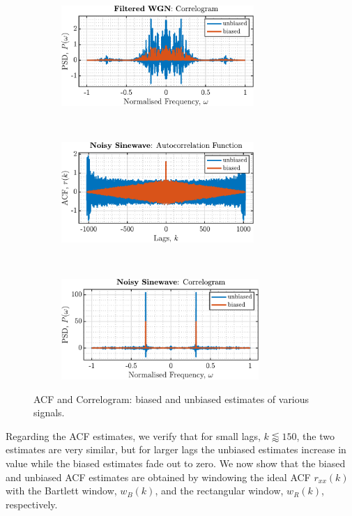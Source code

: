 \begin{enumerate}[label=\alph*), leftmargin=*]
\begin{figure}[h]
\begin{subfigure}{0.49\textwidth}
    \end{subfigure}
    ~ 
    \begin{subfigure}{0.49\textwidth}
        \centering
        \includegraphics[height=1.5in]{report/parametric-and-line-spectra/correlation-estimation/assets/a/psd-Filtered_WGN}
    \end{subfigure}
    ~
    ~
    \begin{subfigure}{0.49\textwidth}
        \centering
        \includegraphics[height=1.5in]{report/parametric-and-line-spectra/correlation-estimation/assets/a/acf-Noisy_Sinewave}
    \end{subfigure}
    ~
    \begin{subfigure}{0.49\textwidth}
        \centering
        \includegraphics[height=1.5in]{report/parametric-and-line-spectra/correlation-estimation/assets/a/psd-Noisy_Sinewave}
    \end{subfigure}
    \caption{ACF and Correlogram: biased and unbiased estimates of various signals.}
    \label{fig:2_1_a}
\end{figure}

Regarding the ACF estimates, we verify that for small lags, $k \lessapprox 150$, the two estimates are very similar, but for larger lags 
the unbiased estimates increase in value while the biased estimates fade out to zero. We now show that the biased and unbiased ACF
estimates are obtained by windowing the ideal ACF $r_{xx}(k)$ with the Bartlett window, $w_{B}(k)$, and the rectangular window, $w_{R}(k)$, respectively.


\end{enumerate}
